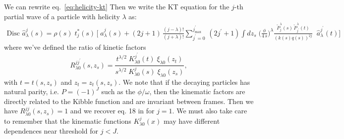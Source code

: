\documentclass[10pt, aps,prd,amsmath,amssymb,superscriptaddress,onecolumn,
nofootinbib,showpacs,preprintnumbers]{revtex4-1}
\newcommand{\jpmax}{{j^\prime_\text{max}}}
\newcommand{\Disc}{\text{Disc }}
\begin{document}
We can rewrite eq.~\ref{eq:helicity-kt}
Then we write the KT equation for the \(j\)-th partial wave of a particle with helicity \(\lambda\) as:
\begin{align}
  \label{eq:helicity-kt}
  \Disc \hat{a}^j_\lambda(s) = \rho(s) \; t^*_{j}(s) \, \bigg[ \; \hat{a}^j_\lambda(s) + (2j+1) \, \frac{(j-\lambda)!}{(j+\lambda)!} \sum_{j^\prime = 0}^\jpmax \, (2j^\prime+1)
  \int dz_s\;
  \bigg(  \frac{\phi}{4 \, s}\bigg)^\lambda \frac{\tilde{P}^\lambda_j(s) \, \tilde{P}_{j^\prime}^\lambda(t)}{(k(s)q(s))^{2j}} \;  \; \hat{a}^{j^\prime}_\lambda(t)\bigg]
\end{align}
where we've defined the ratio of kinetic factors
  \begin{equation}
    R^{jj^\prime}_{\lambda0}(s,z_s) = \frac{{t}^{\lambda/2}
    \; K^{j^\prime}_{\lambda0}(t) \; \xi_{\lambda0}(z_t)}{s^{\lambda/2} \; K^j_{\lambda0}(s) \;\xi_{\lambda0}(z_s)},
  \end{equation}
with \(t = t(s,z_s)\) and \(z_t = z_t(s,z_s)\). We note that if the decaying particles has natural parity, i.e. \(P = (-1)^J\) such as the \(\phi/\omega\), then the kinematic factors are directly related to the Kibble function and are invariant between frames. Then we have \(R^{jj}_{\lambda0}(s,z_s) = 1\) and we recover eq. 18 in \cite{Danilkin:2014cra} for \(j=1\). We must also take care to remember that the kinematic functions \(K^j_{\lambda0}(x)\) may have different dependences near threshold for \(j < J\).
\newpage
\end{document}
